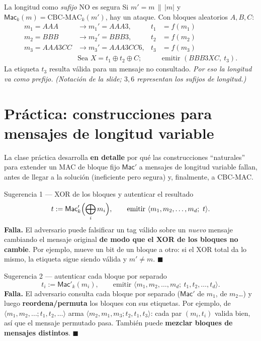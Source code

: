 \documentclass[11pt,a4paper]{article}
\newcommand{\xor}{\oplus}
\newcommand{\concat}{\,\|\,}
\newcommand{\Mac}{\mathsf{Mac}}
\begin{document}
\begin{warnbox}{La longitud como \emph{sufijo} NO es segura}
Si $m'=m\concat |m|$ y $\Mac_k(m)=\text{CBC-MAC}_k(m')$, hay un ataque. Con bloques
aleatorios $A,B,C$:
\[
\begin{aligned}
  m_1=AAA &\to m_1'=AAA3, & t_1&=f(m_1)\\
  m_2=BBB &\to m_2'=BBB3, & t_2&=f(m_2)\\
  m_3=AAA3CC &\to m_3'=AAA3CC6, & t_3&=f(m_3)\\
  &\text{Sea } X=t_1\xor t_2\xor C; &&\text{emitir } (BBB3XC,\ t_3).
\end{aligned}
\]
La etiqueta $t_3$ resulta válida para un mensaje no consultado. \emph{Por eso la longitud va
como prefijo.} \textit{(Notación de la slide; $3,6$ representan los sufijos de longitud.)}
\end{warnbox}

\section{Práctica: construcciones para mensajes de longitud variable}

La clase práctica desarrolla \textbf{en detalle} por qué las construcciones ``naturales''
para extender un MAC de bloque fijo $\Mac'$ a mensajes de longitud variable fallan, antes de
llegar a la solución (ineficiente pero segura) y, finalmente, a CBC-MAC.

\begin{practbox}{Sugerencia 1 — XOR de los bloques y autenticar el resultado}
\[
  t := \Mac'_k\Bigl(\bigoplus_i m_i\Bigr),\qquad \text{emitir } \langle m_1,m_2,\ldots,m_d;\ t\rangle.
\]
\textbf{Falla.} El adversario puede falsificar un tag válido sobre un \emph{nuevo} mensaje
cambiando el mensaje original \textbf{de modo que el XOR de los bloques no cambie}. Por
ejemplo, mueve un bit de un bloque a otro: si el XOR total da lo mismo, la etiqueta sigue
siendo válida y $m'\neq m$. $\blacksquare$
\end{practbox}

\begin{practbox}{Sugerencia 2 — autenticar cada bloque por separado}
\[
  t_i := \Mac'_k(m_i),\qquad \text{emitir } \langle m_1,m_2,\ldots,m_d;\ t_1,t_2,\ldots,t_d\rangle.
\]
\textbf{Falla.} El adversario consulta cada bloque por separado ($\Mac'$ de $m_1$, de
$m_2$\ldots) y luego \textbf{reordena/permuta} los bloques con sus etiquetas. Por ejemplo, de
$\langle m_1,m_2,\ldots; t_1,t_2,\ldots\rangle$ arma
$\langle m_2,m_1,m_3; t_2,t_1,t_3\rangle$: cada par $(m_i,t_i)$ valida bien, así que el
mensaje permutado pasa. También puede \textbf{mezclar bloques de mensajes distintos}.
$\blacksquare$
\end{practbox}
\end{document}
